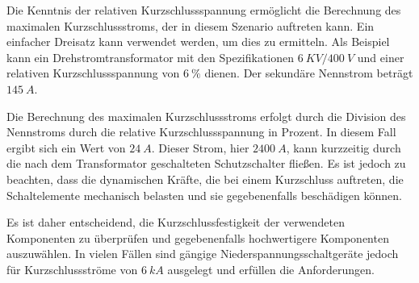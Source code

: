 \begin{enumerate}[label=\alph*)]
        Die Kenntnis der relativen Kurzschlussspannung ermöglicht die Berechnung des
        maximalen Kurzschlussstroms, der in diesem Szenario auftreten kann. Ein
        einfacher Dreisatz kann verwendet werden, um dies zu ermitteln. Als Beispiel
        kann ein Drehstromtransformator mit den Spezifikationen $6\ KV / 400\ V$ und
        einer relativen Kurzschlussspannung von $6\ \%$ dienen. Der sekundäre Nennstrom
        beträgt $145\ A$.

        Die Berechnung des maximalen Kurzschlussstroms erfolgt durch die Division des
        Nennstroms durch die relative Kurzschlussspannung in Prozent. In diesem Fall
        ergibt sich ein Wert von $24\ A$. Dieser Strom, hier $2400\ A$, kann kurzzeitig
        durch die nach dem Transformator geschalteten Schutzschalter fließen. Es ist
        jedoch zu beachten, dass die dynamischen Kräfte, die bei einem Kurzschluss
        auftreten, die Schaltelemente mechanisch belasten und sie gegebenenfalls
        beschädigen können.

        Es ist daher entscheidend, die Kurzschlussfestigkeit der verwendeten
        Komponenten zu überprüfen und gegebenenfalls hochwertigere Komponenten
        auszuwählen. In vielen Fällen sind gängige Niederspannungsschaltgeräte jedoch
        für Kurzschlussströme von $6\ kA$ ausgelegt und erfüllen die Anforderungen.
\end{enumerate}

